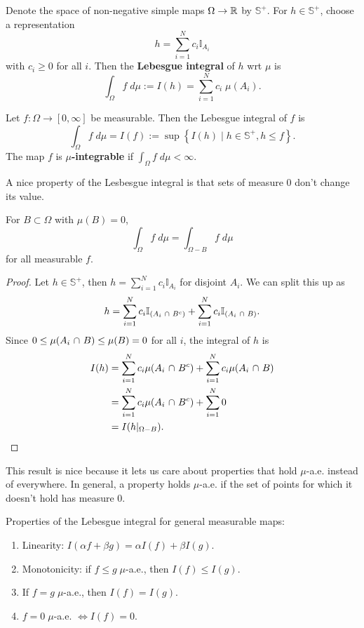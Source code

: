 \documentclass[twoside,10pt]{article}
\begin{document}

\begin{defn}[]
Denote the space of non-negative simple maps $\Omega \to \mathbb{R}$ by $\mathbb{S}^{+}$. For $h \in \mathbb{S}^{+}$, choose a representation
\[
h = \sum_{i=1}^{N} c_{i} \mathbb{I}_{A_{i}}
\] with $c_{i} \geq 0$ for all $i$. Then the \textbf{Lebesgue integral} of $h$ wrt $\mu$ is
\[
	\int_{\Omega} f\;d\mu := I(h) = \sum_{i=1}^{N} c_{i}\; \mu(A_{i}).
\] 
\end{defn}

\begin{defn}[]
Let $f: \Omega \to [0,\infty]$ be measurable. Then the Lebesgue integral of $f$ is
\[
\int_{\Omega} f\;d\mu = I(f) := \sup \left\{ I(h) \;|\; h \in \mathbb{S}^{+}, h\leq f \right\}.
\] The map $f$ is \textbf{$\mu$-integrable} if $\int_{\Omega} f\;d\mu < \infty$.
\end{defn}


A nice property of the Lesbesgue integral is that sets of measure 0 don't change its value.

\begin{prop}
For $B \subset \Omega$ with $\mu(B) = 0$,
\[
\int_{\Omega} f \;d\mu = \int_{\Omega-B} f \;d\mu
\] for all measurable $f$.
\end{prop}
\begin{proof}
	Let $h \in \mathbb{S}^{+}$, then $h = \sum_{i=1}^{N} c_{i} \mathbb{I}_{A_{i}}$ for disjoint $A_{i}$. We can split this up as \[
	h = \sum_{i=1}^{N} c_{i}\mathbb{I}_{(A_{i} \operatorname{\,\cap\,} B^{c})} + \sum_{i=1}^{N} c_{i} \mathbb{I}_{(A_{i} \operatorname{\,\cap\,} B)}.
	\] Since $0 \leq \mu(A_{i}\operatorname{\,\cap\,} B) \leq \mu(B) = 0$ for all $i$, the integral of $h$ is
	\begin{align*}
		I(h) &= \sum_{i=1}^{N} c_{i} \mu(A_{i}\operatorname{\,\cap\,} B^{c}) + \sum_{i=1}^{N} c_{i} \mu(A_{i} \operatorname{\,\cap\,} B) \\
		     &= \sum_{i=1}^{N} c_{i} \mu(A_{i}\operatorname{\,\cap\,} B^{c}) + \sum_{i=1}^{N} 0 \\
		     &= I(h|_{\Omega-B}).
	\end{align*}
\end{proof}

This result is nice because it lets us care about properties that hold $\mu$-a.e. instead of everywhere. In general, a property holds $\mu$-a.e. if the set of points for which it doesn't hold has measure 0.

\begin{prop}
Properties of the Lebesgue integral for general measurable maps:
\begin{enumerate}
	\item Linearity: $I(\alpha f + \beta g) = \alpha I(f) + \beta I(g)$.
	\item Monotonicity: if $f \leq g \; \mu$-a.e., then $I(f) \leq I(g)$.
	\item If $f=g\;\mu$-a.e., then $I(f) = I(g)$.
	\item $f=0 \;\mu$-a.e. $\iff I(f) = 0$.
\end{enumerate}
\end{prop}
\end{document}
